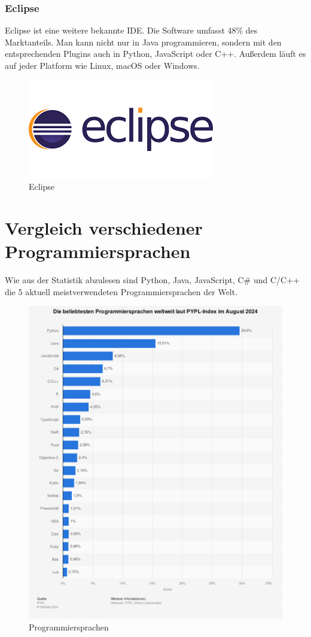 \subsubsection{Eclipse}

Eclipse ist eine weitere bekannte IDE. Die Software umfasst 48\% des Marktanteils. Man kann nicht nur in Java programmieren, sondern mit den entsprechenden Plugins auch in Python, JavaScript oder C++. Außerdem läuft es auf jeder Platform wie Linux, macOS oder Windows. \parencite{Eclipse}

\begin{figure}[H]
	\centering
	\includegraphics[width=0.5\linewidth]{images/eclipse.png}
	\caption[Eclipse]{Eclipse}
	\label{fig:Eclipse}
\end{figure}

\newpage
\section {Vergleich verschiedener Programmiersprachen}
Wie aus der Statistik abzulesen sind Python, Java, JavaScript, C\# und C/C++ die 5 aktuell meistverwendeten Programmiersprachen der Welt. \parencite{meistProgrammiersprachen}


\begin{figure}[H]
	\centering
	\includegraphics[width=0.7\linewidth]{images/Programmiersprachen.png}
	\caption[Programmiersprachen]{Programmiersprachen}
	\label{fig:Programmiersprachen}
\end{figure}

